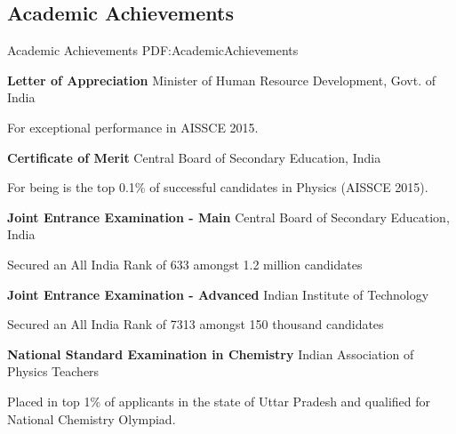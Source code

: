 \documentclass[letterpaper,10pt,oneside]{article}
\begin{document}
\begin{body}

\section
{Academic Achievements}
{Academic Achievements}
{PDF:AcademicAchievements}

\BulletItem
\textbf{Letter of Appreciation}
\hfill
{}
\newline
Minister of Human Resource Development,
Govt. of India
\begin{detail}
\SubItem
For exceptional performance in AISSCE 2015.
\end{detail}

\GapNoBreak

\BulletItem
\textbf{Certificate of Merit} 
\hfill
{}
\newline
Central Board of Secondary Education,
India
\begin{detail}
\SubItem
For being is the top 0.1\% of successful candidates in Physics (AISSCE 2015).
\end{detail}

\GapNoBreak

\BulletItem
\textbf{Joint Entrance Examination - Main}
\hfill
{}
\newline
Central Board of Secondary Education, India
\begin{detail}
\SubItem
Secured an All India Rank of 633 amongst 1.2 million candidates
\end{detail}

\GapNoBreak

\BulletItem
\textbf{Joint Entrance Examination - Advanced}
\hfill
{}
\newline
Indian Institute of Technology
\begin{detail}
\SubItem
Secured an All India Rank of 7313 amongst 150 thousand candidates
\end{detail}

\GapNoBreak

\BulletItem
\textbf{National Standard Examination in Chemistry}
\hfill
{}
\newline
Indian Association of Physics Teachers
\begin{detail}
\SubItem
Placed in top 1\% of applicants in the state of Uttar Pradesh and qualified for National Chemistry Olympiad.
\end{detail}


\end{body}
\end{document}
